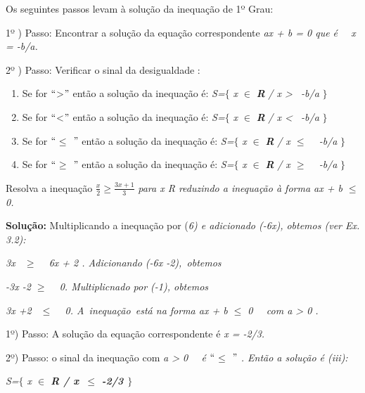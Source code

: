 \begin{caixa}

Os seguintes passos levam à solução da inequação de 1º Grau: 

1º ) Passo: Encontrar a solução da equação correspondente \textit{ax + b = 0 que é~~ x = -b/a.}

2º ) Passo: Verificar o sinal da desigualdade :

\begin{enumerate}
	\item Se for $``$>$"$  então a solução da inequação é:  \textit{S=}$ \{ $ \textit{x $\in$ } \textbf{\textit{R}} \textit{/ x >~ -b/a} $ \} $ 

	\item Se for $``$<$"$  então a solução da inequação é:  \textit{S=}$ \{ $ \textit{x $\in$ } \textbf{\textit{R}} \textit{/ x <~ -b/a} $ \} $ 

	\item Se for \textit{$``$$ \leq $ $"$ } então a solução da inequação é:  \textit{S=}$ \{ $ \textit{x $\in$ } \textbf{\textit{R}} \textit{/ x $ \leq $ ~ -b/a} $ \} $ 

	\item Se for \textit{$``$$ \geq $ $"$ } então a solução da inequação é:  \textit{S=}$ \{ $ \textit{x $\in$ } \textbf{\textit{R}} \textit{/ x $ \geq $ ~ -b/a} $ \} $ 
\end{enumerate}
\end{caixa}

\begin{texemplo}
    Resolva a inequação \( \frac{x}{2} \geq \frac{3x+1}{3} \) \textit{ para x  R reduzindo a inequação à forma ax + b $ \leq $   0.}

\textbf{Solução:} Multiplicando a inequação por (\textit{6) e adicionado (-6x), obtemos (ver Ex. 3.2):}

\textit{3x~ $ \geq $ ~ 6x + 2 . Adicionando (-6x -2),~obtemos  }

\textit{-3x -2  $ \geq $ ~ 0. Multiplicnado por (-1), obtemos~~~  }

\textit{3x +2~ $ \leq $ ~ 0. A~inequação~está na forma   ax + b $ \leq $   0~~ com a > 0 .}

1º) Passo: A solução da equação correspondente é \textit{x = -2/3.}

2º) Passo: o sinal da inequação com \textit{a > 0~~ é $``$$ \leq $ $"$ . Então a solução é (iii):}

\textit{S=$ \{ $ x $\in$  \textbf{R / x~$ \leq $   -2/3 $ \} $  \qedsymbol{}}}
\end{texemplo}

